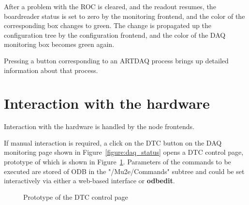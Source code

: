 After a problem with the ROC is cleared, and the readout resumes, the boardreader status
is set to zero by the monitoring frontend, and the color of the corresponding box changes to green.
The change is propagated up the configuration tree by the configuration frontend,
and the color of the DAQ monitoring box becomes green again.

Pressing a button corresponding to an ARTDAQ process brings up detailed
information about that process. 


\section{Interaction with the hardware}

Interaction with the hardware is handled by the node frontends.

If manual interaction is required, a click on the DTC button on the DAQ monitoring
page shown in Figure~\ref{figure:daq_status} opens a DTC control page, prototype of which
is shown in  Figure~\ref{figure:dtc_control_page}. Parameters of the commands to be executed
are stored of ODB in the "/Mu2e/Commands" subtree and could be set interactively
via either a web-based interface or {\bf odbedit}. 

\begin{figure}[H]
  \caption{
    \label{figure:dtc_control_page}
    Prototype of the DTC control page
  }
\end{figure}
